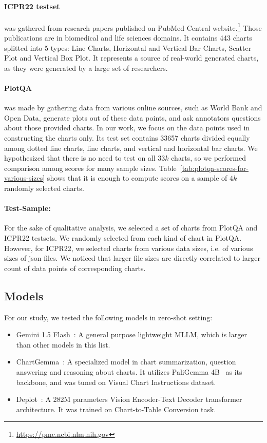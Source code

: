 \documentclass[
	letterpaper, %
]{jdf}
\begin{document}
\paragraph{ICPR22 testset~\cite{rousseau2023pattern}} was gathered from research papers published on PubMed Central website.\footnote{\href{https://pmc.ncbi.nlm.nih.gov}{https://pmc.ncbi.nlm.nih.gov}}
Those publications are in biomedical and life sciences domains.
It contains 443 charts splitted into 5 types: Line Charts, Horizontal and Vertical Bar Charts, Scatter Plot and Vertical Box Plot.
It represents a source of real-world generated charts, as they were generated by a large set of researchers.

\paragraph{PlotQA~\cite{methani2020plotqa}} was made by gathering data from various online sources, such as World Bank and Open Data, generate plots out of these data points, and ask annotators questions about those provided charts.
In our work, we focus on the data points used in constructing the charts only.
Its test set contains 33657 charts divided equally among dotted line charts, line charts, and vertical and horizontal bar charts.
We hypothesized that there is no need to test on all $33k$ charts, so we performed comparison among scores for many sample sizes.
Table~\ref{tab:plotqa-scores-for-various-sizes} shows that it is enough to compute scores on a sample of $4k$ randomly selected charts.

\paragraph{Test-Sample:} For the sake of qualitative analysis, we selected a set of charts from PlotQA and ICPR22 testsets.
We randomly selected from each kind of chart in PlotQA.
However, for ICPR22, we selected charts from various data sizes, i.e. of various sizes of json files.
We noticed that larger file sizes are directly correlated to larger count of data points of corresponding charts.

\subsection{Models}\label{ssect:models}
For our study, we tested the following models in zero-shot setting:
\begin{itemize}
  \item Gemini 1.5 Flash~\cite{team2024gemini}: A general purpose lightweight MLLM, which is larger than other models in this list.
     \item ChartGemma~\cite{masry2024chartgemma}: A specialized model in chart summarization, question answering and reasoning about charts.
       It utilizes PaliGemma 4B~\cite{beyer2024paligemma} as its backbone, and was tuned on Visual Chart Instructions dataset.
     \item Deplot~\cite{liu2022deplot}: A 282M parameters Vision Encoder-Text Decoder transformer architecture.
         It was trained on Chart-to-Table Conversion task.
       \end{itemize}
\end{document}
